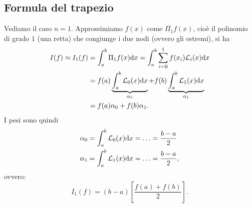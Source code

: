 \subsection{Formula del trapezio}
Vediamo il caso $n=1$. Approssimiamo $f( x)$ come $\Pi _{1} f( x)$, cioè il polinomio di grado $1$ (una retta) che congiunge i due nodi (ovvero gli estremi), si ha
\begin{align*}
I( f) \approx I_{1}( f) & =\int\nolimits ^{b}_{a} \Pi _{1} f( x) \mathrm d x=\int\nolimits ^{b}_{a}\sum\limits ^{1}_{i=0} f( x_{i})\mathcal{L}_{i}( x) \mathrm d x\\
 & =f( a)\underbrace{\int\nolimits ^{b}_{a}\mathcal{L}_{0}( x) \mathrm d x}_{\alpha _{0}} +f( b)\underbrace{\int\nolimits ^{b}_{a}\mathcal{L}_{1}( x) \mathrm d x}_{\alpha _{1}}\\
 & =f( a) \alpha _{0} +f( b) \alpha _{1}.
\end{align*}
I pesi sono quindi
\begin{align*}
\alpha _{0} & =\int\nolimits ^{b}_{a}\mathcal{L}_{0}( x) \mathrm d x=\dotsc =\frac{b-a}{2}\\
\alpha _{1} & =\int\nolimits ^{b}_{a}\mathcal{L}_{1}( x) \mathrm d x=\dotsc =\frac{b-a}{2},
\end{align*}
ovvero:
\begin{equation*}
I_{1}( f) =( b-a)\left[\frac{f( a) +f( b)}{2}\right].
\end{equation*}


